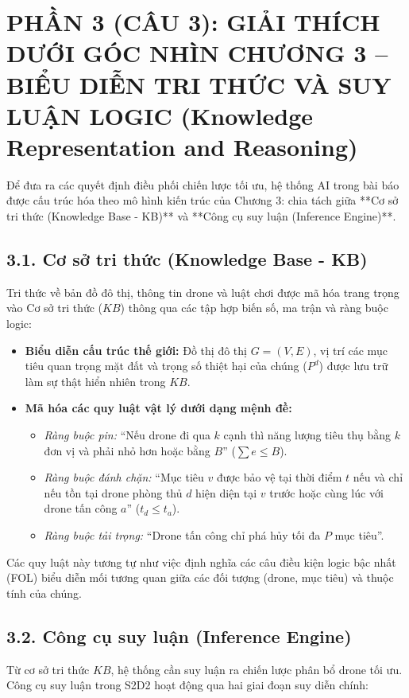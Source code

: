 \documentclass[../main.tex]{subfiles}
\begin{document}

\section{PHẦN 3 (CÂU 3): GIẢI THÍCH DƯỚI GÓC NHÌN CHƯƠNG 3 -- BIỂU DIỄN TRI THỨC VÀ SUY LUẬN LOGIC (Knowledge Representation and Reasoning)}

Để đưa ra các quyết định điều phối chiến lược tối ưu, hệ thống AI trong bài báo \cite{mutzari2025defending} được cấu trúc hóa theo mô hình kiến trúc của Chương 3: chia tách giữa **Cơ sở tri thức (Knowledge Base - KB)** và **Công cụ suy luận (Inference Engine)**.

\subsection{3.1. Cơ sở tri thức (Knowledge Base - KB)}
Tri thức về bản đồ đô thị, thông tin drone và luật chơi được mã hóa trang trọng vào Cơ sở tri thức ($KB$) thông qua các tập hợp biến số, ma trận và ràng buộc logic:
\begin{itemize}
    \item \textbf{Biểu diễn cấu trúc thế giới:} Đồ thị đô thị $G=(V,E)$, vị trí các mục tiêu quan trọng mặt đất và trọng số thiệt hại của chúng ($P^d$) được lưu trữ làm sự thật hiển nhiên trong $KB$.
    \item \textbf{Mã hóa các quy luật vật lý dưới dạng mệnh đề:}
    \begin{itemize}
        \item \textit{Ràng buộc pin:} ``Nếu drone đi qua $k$ cạnh thì năng lượng tiêu thụ bằng $k$ đơn vị và phải nhỏ hơn hoặc bằng $B$'' ($\sum e \le B$).
        \item \textit{Ràng buộc đánh chặn:} ``Mục tiêu $v$ được bảo vệ tại thời điểm $t$ nếu và chỉ nếu tồn tại drone phòng thủ $d$ hiện diện tại $v$ trước hoặc cùng lúc với drone tấn công $a$'' ($t_d \le t_a$).
        \item \textit{Ràng buộc tải trọng:} ``Drone tấn công chỉ phá hủy tối đa $P$ mục tiêu''.
    \end{itemize}
\end{itemize}
Các quy luật này tương tự như việc định nghĩa các câu điều kiện logic bậc nhất (FOL) biểu diễn mối tương quan giữa các đối tượng (drone, mục tiêu) và thuộc tính của chúng.

\subsection{3.2. Công cụ suy luận (Inference Engine)}
Từ cơ sở tri thức $KB$, hệ thống cần suy luận ra chiến lược phân bổ drone tối ưu. Công cụ suy luận trong S2D2 hoạt động qua hai giai đoạn suy diễn chính:
\end{document}
